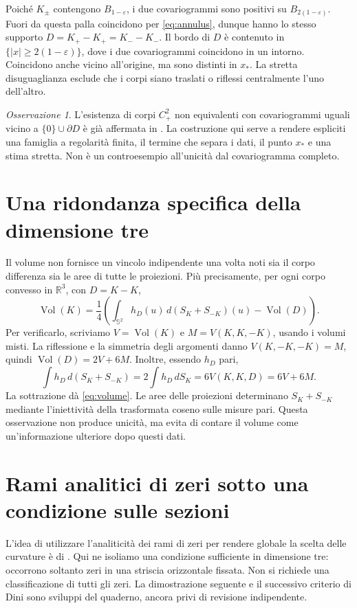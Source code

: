 \documentclass[11pt,a4paper]{article}
\theoremstyle{remark}
\newtheorem*{remark}{Osservazione}
\newcommand{\R}{\mathbb R}
\newcommand{\Sph}{\mathbb S^2}
\newcommand{\vol}{\operatorname{Vol}}
\begin{document}
Poiché $K_\pm$ contengono $B_{1-\varepsilon}$, i due covariogrammi sono
positivi su $B_{2(1-\varepsilon)}$. Fuori da questa palla coincidono per
\eqref{eq:annulus}, dunque hanno lo stesso supporto
$D=K_+-K_+=K_--K_-$. Il bordo di $D$ è contenuto in
$\{|x|\ge2(1-\varepsilon)\}$, dove i due covariogrammi coincidono in un
intorno. Coincidono anche vicino all'origine, ma sono distinti in $x_*$.
La stretta disuguaglianza esclude che i corpi siano traslati o riflessi
centralmente l'uno dell'altro.

\begin{remark}
L'esistenza di corpi $C^2_+$ non equivalenti con covariogrammi uguali
vicino a $\{0\}\cup\partial D$ è già affermata in
\cite[Teorema 6, ultima parte]{AB07}. La costruzione qui serve a rendere
espliciti una famiglia a regolarità finita, il termine che separa i dati,
il punto $x_*$ e una stima stretta. Non è un controesempio all'unicità
dal covariogramma completo.
\end{remark}

\section{Una ridondanza specifica della dimensione tre}
Il volume non fornisce un vincolo indipendente una volta noti sia il
corpo differenza sia le aree di tutte le proiezioni. Più precisamente,
per ogni corpo convesso in $\R^3$, con $D=K-K$,
\begin{equation}\label{eq:volume}
\vol(K)=\frac14\left(
\int_{\Sph}h_D(u)\,d(S_K+S_{-K})(u)-\vol(D)\right).
\end{equation}
Per verificarlo, scriviamo $V=\vol(K)$ e $M=V(K,K,-K)$, usando i volumi
misti. La riflessione e la simmetria degli argomenti danno
$V(K,-K,-K)=M$, quindi $\vol(D)=2V+6M$. Inoltre, essendo $h_D$ pari,
\[
\int h_D\,d(S_K+S_{-K})=2\int h_D\,dS_K
=6V(K,K,D)=6V+6M.
\]
La sottrazione dà \eqref{eq:volume}.
Le aree delle proiezioni determinano $S_K+S_{-K}$ mediante
l'iniettività della trasformata coseno sulle misure pari. Questa
osservazione non produce unicità, ma evita di contare il volume come
un'informazione ulteriore dopo questi dati.

\section{Rami analitici di zeri sotto una condizione sulle sezioni}
\label{sec:zeros}
L'idea di utilizzare l'analiticità dei rami di zeri per rendere globale
la scelta delle curvature è di \cite{B16}. Qui ne isoliamo una condizione
sufficiente in dimensione tre: occorrono soltanto zeri in una striscia
orizzontale fissata. Non si richiede una classificazione di tutti gli zeri.
La dimostrazione seguente e il successivo criterio di Dini sono sviluppi
del quaderno, ancora privi di revisione indipendente.
\end{document}
